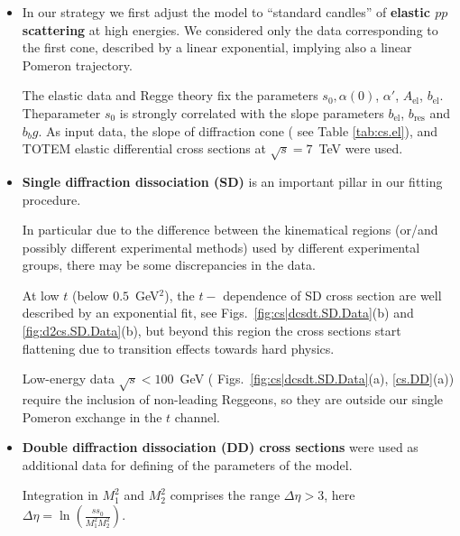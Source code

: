 \documentclass[12pt]{article}
\begin{document}
\begin{itemize}
 \item In our strategy we  first adjust the model to ``standard candles'' of {\bf elastic $pp$ scattering} at high energies. We considered only the data corresponding to the first cone, described by a linear exponential, implying also a linear Pomeron trajectory.

 The elastic data and Regge theory fix the parameters  $s_0, \alpha(0)$, $\alpha'$, $A_\mathrm{el}$, $b_\mathrm{el}$.
 Theparameter $s_0$  is strongly correlated with the slope parameters $b_\mathrm{el}$, $b_\mathrm{res}$ and $b_bg$.
 As input data, the slope of diffraction cone ( see Table \ref{tab:cs.el}), and TOTEM elastic differential cross sections \cite{[T1].TOTEM, [T2].TOTEM} at $\sqrt{s}=7$~TeV were used.



\item {\bf Single diffraction dissociation (SD)} is an important pillar in our fitting procedure.

In particular due to the difference between the kinematical regions (or/and possibly different experimental methods) used by different experimental groups, there may be some discrepancies in the data. 

At low $t$ (below $0.5$~GeV$^2$), the $t-$ dependence of SD cross section are well described by an exponential fit, see Figs.~\ref{fig:cs|dcsdt.SD.Data}(b) and \ref{fig:d2cs.SD.Data}(b), but beyond this region the cross sections start flattening due to transition effects towards hard physics.

Low-energy data $\sqrt{s}<100$~GeV ( Figs.~\ref{fig:cs|dcsdt.SD.Data}(a), \ref{cs.DD}(a)) require the inclusion of non-leading Reggeons, so they are outside our single Pomeron exchange in the $t$ channel.

\item {\bf Double diffraction dissociation (DD) cross sections} were used as additional data for defining of the parameters of the model.

Integration in $M_1^2$ and $M_2^2$ comprises the range $\Delta\eta>3$, here $\Delta\eta=\ln\left(\frac{ss_0}{M_1^2M_2^2}\right)$.
\end{itemize}
\end{document}
